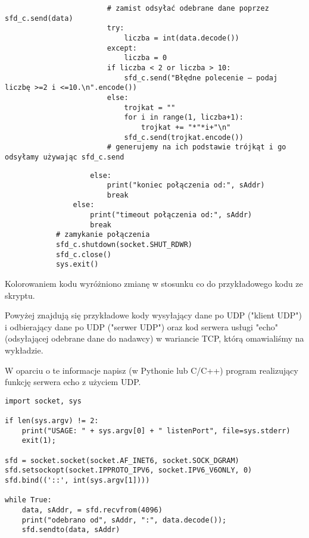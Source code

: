 \begin{verbatim}
                        # zamist odsyłać odebrane dane poprzez sfd_c.send(data)
                        try:
                            liczba = int(data.decode())
                        except:
                            liczba = 0
                        if liczba < 2 or liczba > 10:
                            sfd_c.send("Błędne polecenie – podaj liczbę >=2 i <=10.\n".encode())
                        else:
                            trojkat = ""
                            for i in range(1, liczba+1):
                                trojkat += "*"*i+"\n"
                            sfd_c.send(trojkat.encode())
                        # generujemy na ich podstawie trójkąt i go odsyłamy używając sfd_c.send
\end{verbatim}
\begin{Verbatim}
                    else:
                        print("koniec połączenia od:", sAddr)
                        break
                else:
                    print("timeout połączenia od:", sAddr)
                    break
            # zamykanie połączenia
            sfd_c.shutdown(socket.SHUT_RDWR)
            sfd_c.close()
            sys.exit()
\end{Verbatim}
Kolorowaniem kodu wyróżniono zmianę w stosunku co do przykładowego kodu ze skryptu.
\fi


\dbEntryCheckResults
Powyżej znajdują się przykładowe kody wysyłający dane po UDP ("klient UDP") i odbierający dane po UDP ("serwer UDP")
oraz kod serwera usługi "echo" (odsyłającej odebrane dane do nadawcy) w wariancie TCP, którą omawialiśmy na wykładzie.

W oparciu o te informacje napisz (w Pythonie lub C/C++) program realizujący funkcję serwera echo z użyciem UDP.
\fi

\dbEntryCheckResults
\begin{verbatim}
import socket, sys

if len(sys.argv) != 2:
    print("USAGE: " + sys.argv[0] + " listenPort", file=sys.stderr)
    exit(1);

sfd = socket.socket(socket.AF_INET6, socket.SOCK_DGRAM)
sfd.setsockopt(socket.IPPROTO_IPV6, socket.IPV6_V6ONLY, 0)
sfd.bind(('::', int(sys.argv[1])))

while True:
    data, sAddr, = sfd.recvfrom(4096)
    print("odebrano od", sAddr, ":", data.decode());
    sfd.sendto(data, sAddr)
\end{verbatim}
\fi


